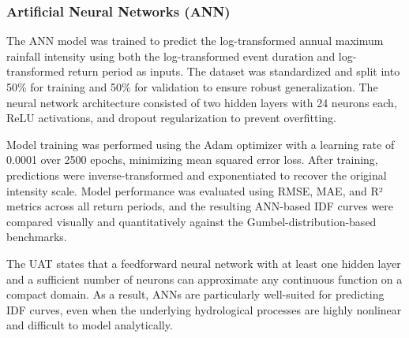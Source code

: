 \subsubsection{Artificial Neural Networks (ANN)}

The ANN model was trained to predict the log-transformed annual maximum rainfall intensity using both the log-transformed event duration and log-transformed return period as inputs. The dataset was standardized and split into 50\% for training and 50\% for validation to ensure robust generalization. The neural network architecture consisted of two hidden layers with 24 neurons each, ReLU activations, and dropout regularization to prevent overfitting.

\vspace{1em}

Model training was performed using the Adam optimizer with a learning rate of 0.0001 over 2500 epochs, minimizing mean squared error loss. After training, predictions were inverse-transformed and exponentiated to recover the original intensity scale. Model performance was evaluated using RMSE, MAE, and R² metrics across all return periods, and the resulting ANN-based IDF curves were compared visually and quantitatively against the Gumbel-distribution-based benchmarks.

\vspace{1em}

The UAT states that a feedforward neural network with at least one hidden layer and a sufficient number of neurons can approximate any continuous function on a compact domain. As a result, ANNs are particularly well-suited for predicting IDF curves, even when the underlying hydrological processes are highly nonlinear and difficult to model analytically.